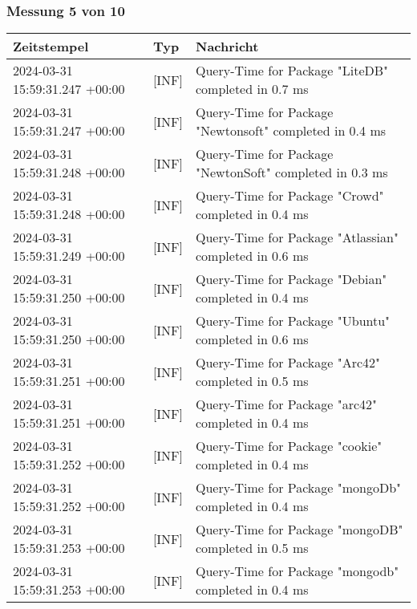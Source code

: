         \subsubsection*{Messung 5 von 10} \label{subsubsec:MySQLMitIndex5von10}
        {
            {\small
                \begin{tabularx}{\textwidth}{|l|l|X|}
                    \hline
                    \textbf{Zeitstempel} & \textbf{Typ} & \textbf{Nachricht} \\
                    \hline
                    \endhead
                    2024-03-31 15:59:31.247 +00:00 & [INF] & Query-Time for Package "LiteDB" completed in 0.7 ms \\
                    2024-03-31 15:59:31.247 +00:00 & [INF] & Query-Time for Package "Newtonsoft" completed in 0.4 ms \\
                    2024-03-31 15:59:31.248 +00:00 & [INF] & Query-Time for Package "NewtonSoft" completed in 0.3 ms \\
                    2024-03-31 15:59:31.248 +00:00 & [INF] & Query-Time for Package "Crowd" completed in 0.4 ms \\
                    2024-03-31 15:59:31.249 +00:00 & [INF] & Query-Time for Package "Atlassian" completed in 0.6 ms \\
                    2024-03-31 15:59:31.250 +00:00 & [INF] & Query-Time for Package "Debian" completed in 0.4 ms \\
                    2024-03-31 15:59:31.250 +00:00 & [INF] & Query-Time for Package "Ubuntu" completed in 0.6 ms \\
                    2024-03-31 15:59:31.251 +00:00 & [INF] & Query-Time for Package "Arc42" completed in 0.5 ms \\
                    2024-03-31 15:59:31.251 +00:00 & [INF] & Query-Time for Package "arc42" completed in 0.4 ms \\
                    2024-03-31 15:59:31.252 +00:00 & [INF] & Query-Time for Package "cookie" completed in 0.4 ms \\
                    2024-03-31 15:59:31.252 +00:00 & [INF] & Query-Time for Package "mongoDb" completed in 0.4 ms \\
                    2024-03-31 15:59:31.253 +00:00 & [INF] & Query-Time for Package "mongoDB" completed in 0.5 ms \\
                    2024-03-31 15:59:31.253 +00:00 & [INF] & Query-Time for Package "mongodb" completed in 0.4 ms \\

\end{tabularx}}}
